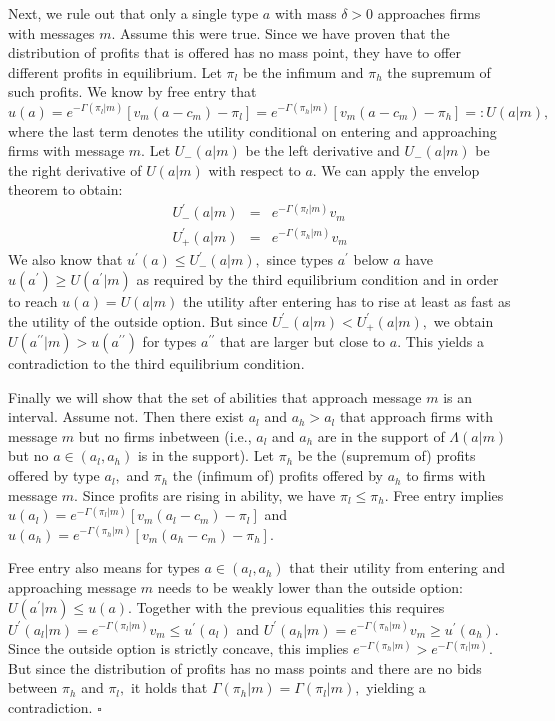 \documentclass[12pt]{article}
\begin{document}
Next, we rule out that only a single type $a$ with mass $\delta >0$
approaches firms with messages $m$. Assume this were true. Since we have
proven that the distribution of profits that is offered has no mass point,
they have to offer different profits in equilibrium. Let $\pi _{l}$ be the
infimum and $\pi _{h}$ the supremum of such profits. We know by free entry
that $u(a)=e^{-\Gamma (\pi _{l}|m)}\left[ v_{m}(a-c_{m})-\pi _{l}\right]
=e^{-\Gamma (\pi _{h}|m)}\left[ v_{m}(a-c_{m})-\pi _{h}\right] =:U(a|m),$
where the last term denotes the utility conditional on entering and
approaching firms with message $m.$ Let $U_{-}(a|m)$ be the left derivative
and $U_{-}(a|m)$ be the right derivative of $U(a|m)$ with respect to $a.$ We
can apply the envelop theorem to obtain:%
\begin{eqnarray*}
U_{-}^{\prime }(a|m) &=&e^{-\Gamma (\pi _{l}|m)}v_{m} \\
U_{+}^{\prime }(a|m) &=&e^{-\Gamma (\pi _{h}|m)}v_{m}
\end{eqnarray*}%
We also know that $u^{\prime }(a)\leq U_{-}^{\prime }(a|m),$ since types $%
a^{\prime }$ below $a$ have $u(a^{\prime })\geq U(a^{\prime }|m)$ as
required by the third equilibrium condition and in order to reach $%
u(a)=U(a|m)$ the utility after entering has to rise at least as fast as the
utility of the outside option. But since $U_{-}^{\prime }(a|m)<U_{+}^{\prime
}(a|m),$ we obtain $U(a^{\prime \prime }|m)>u(a^{\prime \prime })$ for types 
$a^{\prime \prime }$ that are larger but close to $a.$ This yields a
contradiction to the third equilibrium condition.

Finally we will show that the set of abilities that approach message $m$ is
an interval. Assume not. Then there exist $a_{l}$ and $a_{h}>a_{l}$ that
approach firms with message $m$ but no firms inbetween (i.e., $a_{l}$ and $%
a_{h}$ are in the support of $\Lambda (a|m)$ but no $a\in (a_{l},a_{h})$ is
in the support). Let $\pi _{h}$ be the (supremum of) profits offered by type 
$a_{l},$ and $\pi _{h}$ the (infimum of) profits offered by $a_{h}$ to firms
with message $m.$ Since profits are rising in ability, we have $\pi _{l}\leq
\pi _{h}.$ Free entry implies $u(a_{l})=e^{-\Gamma (\pi _{l}|m)}\left[
v_{m}(a_{l}-c_{m})-\pi _{l}\right] $ and $u(a_{h})=e^{-\Gamma (\pi _{h}|m)}%
\left[ v_{m}(a_{h}-c_{m})-\pi _{h}\right] .$

Free entry also means for types $a\in (a_{l},a_{h})$ that their utility from
entering and approaching message $m$ needs to be weakly lower than the
outside option: $U(a^{\prime }|m)\leq u(a).$ Together with the previous
equalities this requires $U^{\prime }(a_{l}|m)=e^{-\Gamma (\pi
_{l}|m)}v_{m}\leq u^{\prime }(a_{l})$ and $U^{\prime }(a_{h}|m)=e^{-\Gamma
(\pi _{h}|m)}v_{m}\geq u^{\prime }(a_{h}).$ Since the outside option is
strictly concave, this implies $e^{-\Gamma (\pi _{h}|m)}>e^{-\Gamma (\pi
_{l}|m)}.$ But since the distribution of profits has no mass points and
there are no bids between $\pi _{h}$ and $\pi _{l},$ it holds that $\Gamma
(\pi _{h}|m)=\Gamma (\pi _{l}|m),$ yielding a contradiction. $\square $
\end{document}
